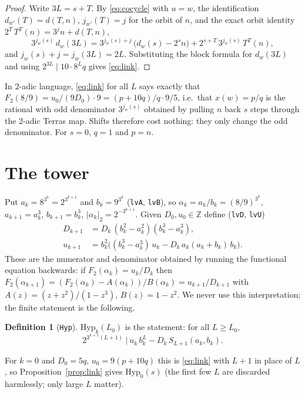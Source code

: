 \documentclass[11pt]{article}
\theoremstyle{definition}
\newtheorem{definition}[theorem]{Definition}
\newcommand{\Z}{\mathbb{Z}}
\newcommand{\code}[1]{\texttt{#1}}
\begin{document}
\begin{proof}
Write $3L = s + T$. By \eqref{eq:cocycle} with $u = w$, the
identification $d_{w'}(T) = d(T,n)$, $j_{w'}(T) = j$ for the orbit of
$n$, and the exact orbit identity $2^T\,T^T(n) = 3^j n + d(T,n)$,
\[
3^{j_w(s)}\, d_w(3L) = 3^{j_w(s) + j}\,\big(d_w(s) - 2^s n\big) +
2^{s+T}\, 3^{j_w(s)}\, T^T(n),
\]
and $j_w(s) + j = j_w(3L) = 2L$. Substituting the block formula for
$d_w(3L)$ and using $2^{3L} \mid 10 \cdot 8^L q$ gives \eqref{eq:link}.
\end{proof}

In $2$-adic language, \eqref{eq:link} for all $L$ says exactly that
$F_2(8/9) = u_0/(9 D_0) \cdot 9 = (p + 10q)/q \cdot 9/5$, i.e.\ that
$x(w) = p/q$ is the rational with odd denominator $3^{j_w(s)}$ obtained
by pulling $n$ back $s$ steps through the $2$-adic Terras map. Shifts
therefore cost nothing: they only change the odd denominator. For
$s = 0$, $q = 1$ and $p = n$.

\section{The tower}\label{sec:tower}

Put $a_k = 8^{3^k} = 2^{3^{k+1}}$ and $b_k = 9^{3^k}$
(\code{lvA}, \code{lvB}), so $\alpha_k = a_k/b_k = (8/9)^{3^k}$,
$a_{k+1} = a_k^3$, $b_{k+1} = b_k^3$, $|\alpha_k|_2 = 2^{-3^{k+1}}$.
Given $D_0, u_0 \in \Z$ define (\code{lvD}, \code{lvU})
\begin{align*}
D_{k+1} &= D_k\,(b_k^2 - a_k^2)(b_k^3 - a_k^3),\\
u_{k+1} &= b_k^2\Big((b_k^3 - a_k^3)\,u_k - D_k\, a_k (a_k + b_k)\, b_k\Big).
\end{align*}
These are the numerator and denominator obtained by running the
functional equation backwards: if $F_2(\alpha_k) = u_k/D_k$ then
$F_2(\alpha_{k+1}) = (F_2(\alpha_k) - A(\alpha_k))/B(\alpha_k) =
u_{k+1}/D_{k+1}$ with $A(z) = (z+z^2)/(1-z^3)$, $B(z) = 1 - z^2$. We
never use this interpretation; the finite statement is the following.

\begin{definition}[\code{Hyp}]
$\mathrm{Hyp}_k(L_0)$ is the statement: for all $L \ge L_0$,
\[
2^{3^{k+1}(L+1)} \ \Big|\ u_k\, b_k^{L} - D_k\, S_{L+1}(a_k, b_k).
\]
\end{definition}

For $k = 0$ and $D_0 = 5q$, $u_0 = 9(p+10q)$ this is \eqref{eq:link}
with $L+1$ in place of $L$, so Proposition~\ref{prop:link} gives
$\mathrm{Hyp}_0(s)$ (the first few $L$ are discarded harmlessly; only
large $L$ matter).
\end{document}
